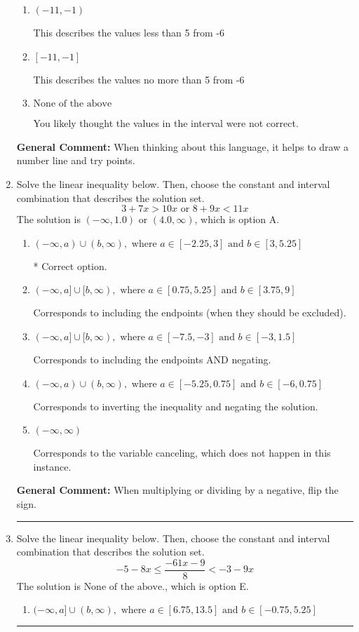 \documentclass{extbook}[14pt]
\newcommand{\litem}[1]{\item #1

\rule{\textwidth}{0.4pt}}
\begin{document}
\begin{enumerate}
{\begin{enumerate}[label=\Alph*.]
This describes the values more than 5 from -6
\item \( (-11, -1) \)

This describes the values less than 5 from -6
\item \( [-11, -1] \)

This describes the values no more than 5 from -6
\item \( \text{None of the above} \)

You likely thought the values in the interval were not correct.
\end{enumerate}

\textbf{General Comment:} When thinking about this language, it helps to draw a number line and try points.
}
\litem{
Solve the linear inequality below. Then, choose the constant and interval combination that describes the solution set.
\[ 3 + 7 x > 10 x \text{ or } 8 + 9 x < 11 x \]The solution is \( (-\infty, 1.0) \text{ or } (4.0, \infty) \), which is option A.\begin{enumerate}[label=\Alph*.]
\item \( (-\infty, a) \cup (b, \infty), \text{ where } a \in [-2.25, 3] \text{ and } b \in [3, 5.25] \)

 * Correct option.
\item \( (-\infty, a] \cup [b, \infty), \text{ where } a \in [0.75, 5.25] \text{ and } b \in [3.75, 9] \)

Corresponds to including the endpoints (when they should be excluded).
\item \( (-\infty, a] \cup [b, \infty), \text{ where } a \in [-7.5, -3] \text{ and } b \in [-3, 1.5] \)

Corresponds to including the endpoints AND negating.
\item \( (-\infty, a) \cup (b, \infty), \text{ where } a \in [-5.25, 0.75] \text{ and } b \in [-6, 0.75] \)

Corresponds to inverting the inequality and negating the solution.
\item \( (-\infty, \infty) \)

Corresponds to the variable canceling, which does not happen in this instance.
\end{enumerate}

\textbf{General Comment:} When multiplying or dividing by a negative, flip the sign.
}
\litem{
Solve the linear inequality below. Then, choose the constant and interval combination that describes the solution set.
\[ -5 - 8 x \leq \frac{-61 x - 9}{8} < -3 - 9 x \]The solution is \( \text{None of the above.} \), which is option E.\begin{enumerate}[label=\Alph*.]
\item \( (-\infty, a] \cup (b, \infty), \text{ where } a \in [6.75, 13.5] \text{ and } b \in [-0.75, 5.25] \)


\end{enumerate}}
\end{enumerate}
\end{document}
